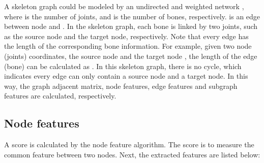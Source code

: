 \documentclass[journal]{IEEEtran}
\begin{document}
A skeleton graph could be modeled by an undirected and weighted network , where  is the number of joints, and  is the number of bones, respectively.  is an edge between node  and . In the skeleton graph, each bone is linked by two joints, such as the source node and the target node, respectively. Note that every edge has the length of the corresponding bone information. For example, given two node (joints) coordinates, the source node  and the target node , the length of the edge (bone) can be calculated as . In this skeleton graph, there is no cycle, which indicates every edge can only contain a source node and a target node. In this way, the graph adjacent matrix, node features, edge features and subgraph features are calculated, respectively.

\subsection{Node features}

A score  is calculated by the node feature algorithm. The score is to measure the common feature between two nodes. Next, the extracted features are listed below:
\end{document}

